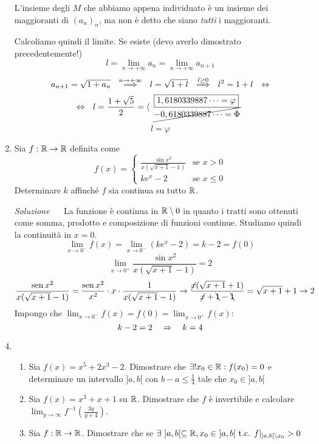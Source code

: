 \documentclass{article}
\begin{document}
\begin{enumerate}[label=\textbf{Esercizio 6.\arabic*.},itemindent=*]
\begin{oss}
        L'insieme degli $M$ che abbiamo appena individuato è un insieme dei maggioranti di $(a_n)_n$, ma non è detto che siano \emph{tutti} i maggioranti.
    \end{oss}
    Calcoliamo quindi il limite. Se esiste (devo averlo dimostrato precedentemente!) \[l=\lim_{n\to+\infty}a_n=\lim_{n\to+\infty}a_{n+1}\]
    \[a_{n+1}=\sqrt{1+a_n}~~\overset{n\to+\infty}\Longrightarrow~~l=\sqrt{1+l}~~\overset{l\geq0}\Longrightarrow~~l^2=1+l~~\Harr\]
    \[\Harr~~l=\frac{1+\sqrt{5}}{2}=\langle\begin{array}{l}
        \boxed{1,6180339887\dots=\varphi}\\
        \cancel{-0,6180339887\dots=\Phi}
    \end{array}\]
    \[l=\varphi\]
    \item Sia $f: \R\to \R$ definita come \[f(x)=\begin{cases}
        \frac{\sin x^2}{x(\sqrt{x+1}-1)}&\text{se }x>0\\
        ke^x-2 & \text{se }x\leq 0
    \end{cases}\]
    Determinare $k$ affinché $f$ sia continua su tutto $\R$.
    \item[\textit{\large Soluzione~}]~
    La funzione è continua in $\R\setminus 0$ in quanto i tratti sono ottenuti come somma, prodotto e composizione di funzioni continue. Studiamo quindi la continuità in $x=0$.
    \[\lim_{x\to0^-}f(x)=\lim_{x\to0^-}(ke^x-2)=k-2=f(0)\]
    \[\lim_{x\to0^+}\frac{\sin x^2}{x(\sqrt{x+1}-1)}=2\]
    \[\frac{\sin x^2}{x(\sqrt{x+1}-1)}=\frac{\sin x^2}{x^2}\cdot x\cdot \frac{1}{x(\sqrt{x+1}-1)}\to\frac{\cancel{x}(\sqrt{x+1}+1)}{\cancel{x}+\bcancel{1}-\bcancel{1}}=\sqrt{x+1}+1\to 2\]
    Impongo che $\lim_{x\to0^-}f(x)=f(0)=\lim_{x\to0^+}f(x)$:
    \[k-2=2~~~\Rarr~~~k=4\]
\item ~
\begin{enumerate}
    \item Sia $f(x)=x^5+2x^3-2$. Dimostrare che $\exists!x_0\in \R:f(x_0)=0$ e determinare un intervallo $]a,b[$ con $ b-a\leq{\scriptstyle\frac{1}{4}}$ tale che $x_0\in]a,b[$
    \item Sia $f(x)=x^3+x+1$ su $\R$. Dimostrare che $f$ è invertibile e calcolare $\lim_{y\to \infty}f^{-1}\left( \frac{3y}{y+4} \right)$.
    \item Sia $f:\R\to\R$. Dimostrare che se $\exists ~]a,b[\subseteq \R, x_0\in ~]a,b[\text{ t.c. }f|_{]a,b[\setminus x_0}>0$

\end{enumerate}
\end{enumerate}
\end{document}
